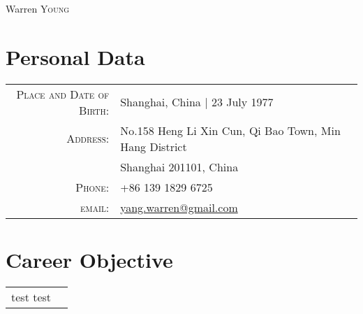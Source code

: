 \documentclass[a4paper,10pt]{article}
\begin{document}
\par{\centering
		{\Huge Warren \textsc{Young}
	}\bigskip\par}

\section{Personal Data}

\begin{tabular}{rl}
    \textsc{Place and Date of Birth:} & Shanghai, China  | 23 July 1977 \\
    \textsc{Address:}   & No.158 Heng Li Xin Cun, Qi Bao Town, Min Hang District \\ & Shanghai 201101, China \\
    \textsc{Phone:}     & +86 139 1829 6725\\
    \textsc{email:}     & \href{mailto:yang.warren@gmail.com}{yang.warren@gmail.com}
\end{tabular}

\section{Career Objective}
\begin{tabular}{rl}
test test \\
\end{tabular}

\end{document}

